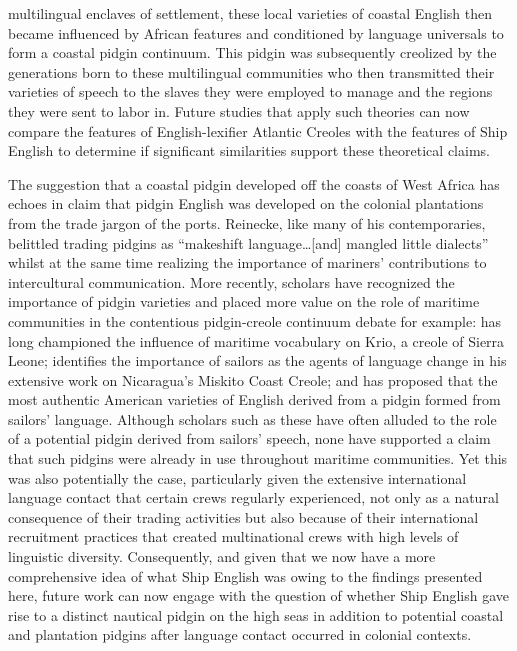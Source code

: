 multilingual enclaves of settlement, these local varieties of coastal English then became influenced by African features and conditioned by language universals to form a coastal pidgin continuum. This pidgin was subsequently creolized by the generations born to these multilingual communities who then transmitted their varieties of speech to the slaves they were employed to manage and the regions they were sent to labor in. Future studies that apply such theories can now compare the features of English-lexifier Atlantic Creoles with the features of Ship English to determine if significant similarities support these theoretical claims. 

The suggestion that a coastal pidgin developed off the coasts of West Africa has echoes in  claim that pidgin English was developed on the colonial plantations from the trade jargon of the ports. Reinecke, like many of his contemporaries, belittled trading pidgins as “makeshift language…[and] mangled little dialects” \citep[107]{Reinecke1938} whilst at the same time realizing the importance of mariners’ contributions to intercultural communication. More recently, scholars have recognized the importance of pidgin varieties and placed more value on the role of maritime communities in the contentious pidgin-creole continuum debate \citep[7,]{Holm1988} for example: \citet{Hancock1976} has long championed the influence of maritime vocabulary on Krio, a creole of Sierra Leone; \citet{Holm1981} identifies the importance of sailors as the agents of language change in his extensive work on Nicaragua’s Miskito Coast Creole; and \citet{Dillard1992} has proposed that the most authentic American varieties of English derived from a pidgin formed from sailors’ language. Although scholars such as these have often alluded to the role of a potential pidgin derived from sailors’ speech, none have supported a claim that such pidgins were already in use throughout maritime communities. Yet this was also potentially the case, particularly given the extensive international language contact that certain crews regularly experienced, not only as a natural consequence of their trading activities but also because of their international recruitment practices that created multinational crews with high levels of linguistic diversity. Consequently, and given that we now have a more comprehensive idea of what Ship English was owing to the findings presented here, future work can now engage with the question of whether Ship English gave rise to a distinct nautical pidgin on the high seas in addition to potential coastal and plantation pidgins after language contact occurred in colonial contexts. 

